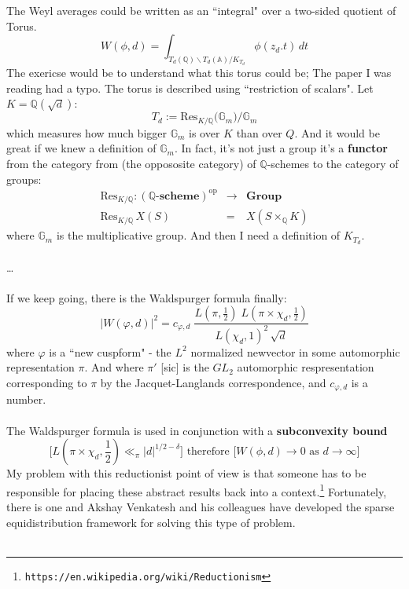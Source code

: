 \documentclass[12pt]{article}
\begin{document}
\noindent The Weyl averages could be written as an ``integral" over a two-sided quotient of Torus.
$$ W(\phi, d) = \int_{T_d(\mathbb{Q}) \backslash T_d(\mathbb{A}) / K_{T_d}} \phi (z_d . t ) \, dt$$
The exericse would be to understand what this torus could be; The paper I was reading had a typo.  The torus is described using ``restriction of scalars".  Let $K = \mathbb{Q}(\sqrt{d})$:
$$    T_d := \mathrm{Res}_{K /\mathbb{Q}}(\mathbb{G}_m \big) / \mathbb{G}_m$$
which measures how much bigger $\mathbb{G}_m$ is over $K$ than over $Q$.  And it would be great if we knew a definition of $\mathbb{G}_m$.  In fact, it's not just a group it's a \textbf{functor} from the category from (the oppososite category) of $\mathbb{Q}$-schemes to the category of groups:
\begin{eqnarray*} 
\mathrm{Res}_{K/\mathbb{Q}} : (\mathbb{Q}\text{-}\textbf{scheme})^{\text{op}} &\to& \textbf{Group} \\
\mathrm{Res}_{K/\mathbb{Q}} \, X(S) &=& X( S \times_\mathbb{Q} K)  
\end{eqnarray*}
where $\mathbb{G}_m$ is the multiplicative group. And then I need a definition of $K_{T_d}$. \\ \\
\dots \\ \\
If we keep going, there is the Waldspurger formula finally:
$$ | W(\varphi, d)|^2 = c_{\varphi, d} \; \frac{L(\pi, \frac{1}{2} ) \; L (\pi \times \chi_d , \frac{1}{2})}{L(\chi_d, 1)^2 \, \sqrt{d}} $$
where $\varphi$ is a ``new cuspform" - the $L^2$ normalized newvector in some automorphic representation $\pi$.  And where $\pi'$ [sic] is the $GL_2$ automorphic respresentation corresponding to $\pi$ by the Jacquet-Langlands correspondence, and $c_{\varphi, d}$ is a number. \\ \\
The Waldspurger formula is used in conjunction with a \textbf{subconvexity bound} 
$$ \bigg[ L(\pi \times \chi_d, \frac{1}{2}) \ll_\pi |d|^{1/2 - \delta} \bigg]\text{ therefore } \bigg[W(\phi, d) \to 0 \text{ as } d \to \infty \bigg]$$
My problem with this reductionist point of view is that someone has to be responsible for placing these abstract results back into a context.\footnote{\texttt{https://en.wikipedia.org/wiki/Reductionism}}  Fortunately, there is one and Akshay Venkatesh and his colleagues have developed the {\color{purple!50!green}sparse equidistribution} framework for solving this type of problem. \\ \\
\end{document}
